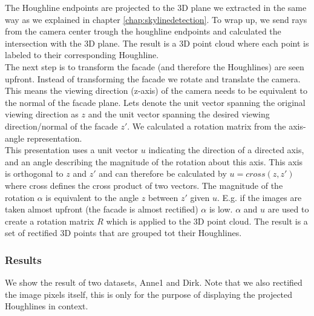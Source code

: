 The Houghline endpoints are projected to the 3D plane we extracted in the same
way as we explained in chapter \ref{chap:skylinedetection}. To wrap up, we send
rays from the camera center trough the houghline endpoints and calculated the
intersection with the 3D plane.  The result is a 3D point cloud where each
point is labeled to their corresponding Houghline.\\

The next step is to transform the facade (and therefore the Houghlines) are
seen upfront. Instead of transforming the facade we rotate and translate the camera. 
This means the viewing direction (z-axis) of the camera needs
to be equivalent to the normal of the facade plane. Lets denote the
unit vector spanning the original viewing direction as $z$ and the
unit vector spanning the desired viewing direction/normal of the facade $z'$.
We calculated a rotation matrix from the axis-angle representation.\\

This presentation uses a unit vector $u$ indicating the direction of a directed axis, and an
angle describing the magnitude of the rotation about this axis.
This axis is orthogonal to $z$ and $z'$ and can therefore be
calculated by $u = cross(z,z')$ where cross defines the cross product of
two vectors.
The magnitude of the rotation $\alpha$ is equivalent to the angle $z$ between $z'$ given $u$. 
E.g. if the images are taken almost upfront (the facade is almost rectified) $\alpha$ is low.
$\alpha$ and $u$ are used to create a rotation matrix $R$ which is applied to the 3D point cloud.
The result is a set of rectified 3D points that are grouped tot their Houghlines.

\subsubsection{Results} %
We show the result of two datasets, Anne1 and Dirk.
Note that we also rectified the image pixels itself, this is only for
the purpose of displaying the projected Houghlines in context.


\newpage
{}

\newpage
{}

